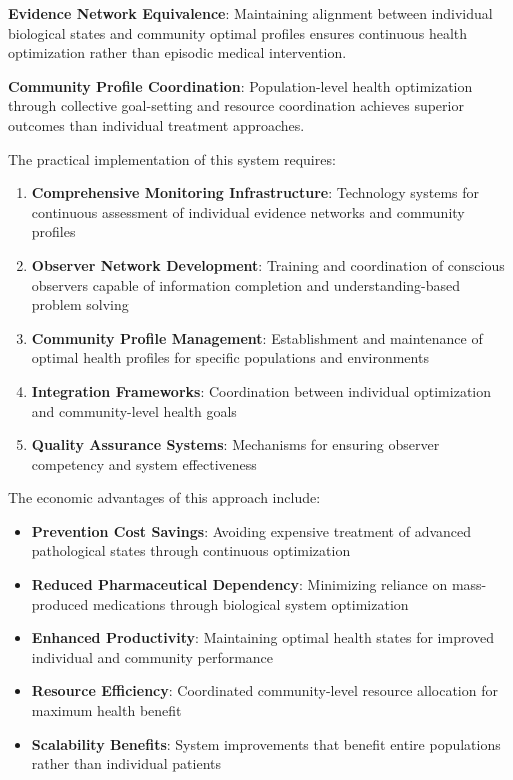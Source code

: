 \documentclass[12pt,a4paper]{article}
\begin{document}
\textbf{Evidence Network Equivalence}: Maintaining alignment between individual biological states and community optimal profiles ensures continuous health optimization rather than episodic medical intervention.

\textbf{Community Profile Coordination}: Population-level health optimization through collective goal-setting and resource coordination achieves superior outcomes than individual treatment approaches.

The practical implementation of this system requires:

\begin{enumerate}
\item \textbf{Comprehensive Monitoring Infrastructure}: Technology systems for continuous assessment of individual evidence networks and community profiles
\item \textbf{Observer Network Development}: Training and coordination of conscious observers capable of information completion and understanding-based problem solving
\item \textbf{Community Profile Management}: Establishment and maintenance of optimal health profiles for specific populations and environments
\item \textbf{Integration Frameworks}: Coordination between individual optimization and community-level health goals
\item \textbf{Quality Assurance Systems}: Mechanisms for ensuring observer competency and system effectiveness
\end{enumerate}

The economic advantages of this approach include:

\begin{itemize}
\item \textbf{Prevention Cost Savings}: Avoiding expensive treatment of advanced pathological states through continuous optimization
\item \textbf{Reduced Pharmaceutical Dependency}: Minimizing reliance on mass-produced medications through biological system optimization
\item \textbf{Enhanced Productivity}: Maintaining optimal health states for improved individual and community performance
\item \textbf{Resource Efficiency}: Coordinated community-level resource allocation for maximum health benefit
\item \textbf{Scalability Benefits}: System improvements that benefit entire populations rather than individual patients
\end{itemize}
\end{document}
